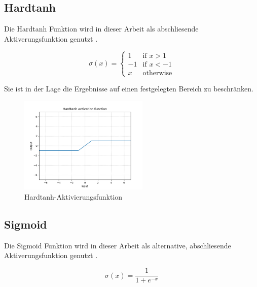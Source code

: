 \subsection{Hardtanh}
\label{sec:hardtanh}

Die Hardtanh Funktion wird in dieser Arbeit als abschliesende Aktiverungsfunktion genutzt \cite{DBLP:journals/corr/abs-1811-03378, Collobert:2011:NLP:1953048.2078186}.

\begin{equation}
	\sigma(x) = {
		\begin{cases}
			1  & {\text{if }} x > 1 \\ 
			-1 & {\text{if }} x < -1 \\
			x  & {\text{otherwise}}
		\end{cases}
	 }
\end{equation}

\pagebreak

Sie ist in der Lage die Ergebnisse auf einen festgelegten Bereich zu beschränken.

\begin{figure}[H]
	\centering
	\includegraphics[width=0.55\textwidth]{resources/content/Hardtanh.png}
	\caption{Hardtanh-Aktivierungsfunktion \cite{hardtanh_activation_function_img}}
	\label{img:hardtanh_activation_function}
\end{figure}

\subsection{Sigmoid}
\label{sec:sigmoid}

Die Sigmoid Funktion wird in dieser Arbeit als alternative, abschliesende Aktiverungsfunktion genutzt \cite{DBLP:journals/corr/abs-1811-03378}.

\begin{equation}
	\sigma(x) = \frac{ 1 } { 
		1 + e^{ -x }
	}
\end{equation}


